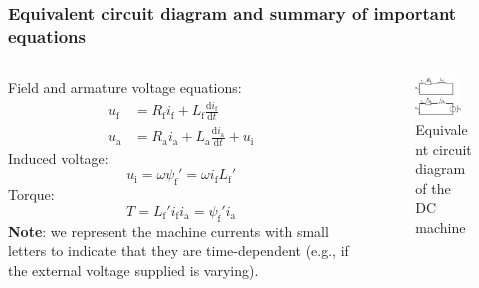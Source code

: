 \begin{frame}
	\frametitle{Equivalent circuit diagram and summary of important equations}
	\begin{columns}
		\begin{column}{0.55\textwidth}
	Field and armature voltage equations:
	\begin{equation}
		\begin{aligned}
			u_\mathrm{f} &= R_\mathrm{f} i_\mathrm{f} + L_\mathrm{f} \frac{\mathrm{d}i_\mathrm{f}}{\mathrm{d}t} \\
			u_\mathrm{a} &= R_\mathrm{a} i_\mathrm{a} + L_\mathrm{a} \frac{\mathrm{d}i_\mathrm{a}}{\mathrm{d}t} + u_\mathrm{i} 
		\end{aligned}
		 \label{eq:DC_machine_ODE_currents}
	\end{equation} \pause
	Induced voltage:
	\begin{equation*}
			u_\mathrm{i} = \omega \psi_\mathrm{f}' = \omega i_\mathrm{f} L_\mathrm{f}' 
	\end{equation*} \pause
	Torque:
	\begin{equation*}
		T =  L_\mathrm{f}' i_\mathrm{f} i_\mathrm{a}  = \psi_\mathrm{f}' i_\mathrm{a}
	\end{equation*} \pause
	\textbf{Note}: we represent the machine currents with small letters to indicate that they are time-dependent (e.g., if the external voltage supplied is varying).
\end{column} \pause
\hfill
\begin{column}{0.45\textwidth}
	\begin{figure}
		\centering
		\includegraphics[width=0.8\textwidth]{fig/lec03/ECD_DC_machine.pdf}
		\caption{Equivalent circuit diagram of the DC machine}
		\label{fig:ECD_DC_machine}
	\end{figure}
\end{column}
\end{columns}
\end{frame}

